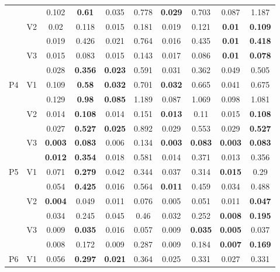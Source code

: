 \documentclass[12pt,a4paper]{article}
\begin{document}
\begin{sidewaystable}[ht]
{\begin{tabular}{cc|cc|cc|cc|cc|}
   &  & 0.102 & \textbf{0.61} & 0.035 & 0.778 & \textbf{0.029} & 0.703 & 0.087 & 1.187 \\ 
   & \multirow{2}{*}{V2} & 0.02 & 0.118 & 0.015 & 0.181 & 0.019 & 0.121 & \textbf{0.01} & \textbf{0.109} \\ 
   &  & 0.019 & 0.426 & 0.021 & 0.764 & 0.016 & 0.435 & \textbf{0.01} & \textbf{0.418} \\ 
   & \multirow{2}{*}{V3} & 0.015 & 0.083 & 0.015 & 0.143 & 0.017 & 0.086 & \textbf{0.01} & \textbf{0.078} \\ 
   &  & 0.028 & \textbf{0.356} & \textbf{0.023} & 0.591 & 0.031 & 0.362 & 0.049 & 0.505 \\ 
   \hline \hline\multirow{6}{*}{P4} & \multirow{2}{*}{V1} & 0.109 & \textbf{0.58} & \textbf{0.032} & 0.701 & \textbf{0.032} & 0.665 & 0.041 & 0.675 \\ 
   &  & 0.129 & \textbf{0.98} & \textbf{0.085} & 1.189 & 0.087 & 1.069 & 0.098 & 1.081 \\ 
   & \multirow{2}{*}{V2} & 0.014 & \textbf{0.108} & 0.014 & 0.151 & \textbf{0.013} & 0.11 & 0.015 & \textbf{0.108} \\ 
   &  & 0.027 & \textbf{0.527} & \textbf{0.025} & 0.892 & 0.029 & 0.553 & 0.029 & \textbf{0.527} \\ 
   & \multirow{2}{*}{V3} & \textbf{0.003} & \textbf{0.083} & 0.006 & 0.134 & \textbf{0.003} & \textbf{0.083} & \textbf{0.003} & \textbf{0.083} \\ 
   &  & \textbf{0.012} & \textbf{0.354} & 0.018 & 0.581 & 0.014 & 0.371 & 0.013 & 0.356 \\ 
   \hline \hline\multirow{6}{*}{P5} & \multirow{2}{*}{V1} & 0.071 & \textbf{0.279} & 0.042 & 0.344 & 0.037 & 0.314 & \textbf{0.015} & 0.29 \\ 
   &  & 0.054 & \textbf{0.425} & 0.016 & 0.564 & \textbf{0.011} & 0.459 & 0.034 & 0.488 \\ 
   & \multirow{2}{*}{V2} & \textbf{0.004} & 0.049 & 0.011 & 0.076 & 0.005 & 0.051 & 0.011 & \textbf{0.047} \\ 
   &  & 0.034 & 0.245 & 0.045 & 0.46 & 0.032 & 0.252 & \textbf{0.008} & \textbf{0.195} \\ 
   & \multirow{2}{*}{V3} & 0.009 & \textbf{0.035} & 0.016 & 0.057 & 0.009 & \textbf{0.035} & \textbf{0.005} & 0.037 \\ 
   &  & 0.008 & 0.172 & 0.009 & 0.287 & 0.009 & 0.184 & \textbf{0.007} & \textbf{0.169} \\ 
   \hline \hline\multirow{6}{*}{P6} & \multirow{2}{*}{V1} & 0.056 & \textbf{0.297} & \textbf{0.021} & 0.364 & 0.025 & 0.331 & 0.027 & 0.331 \\ 

\end{tabular}}
\end{sidewaystable}
\end{document}
